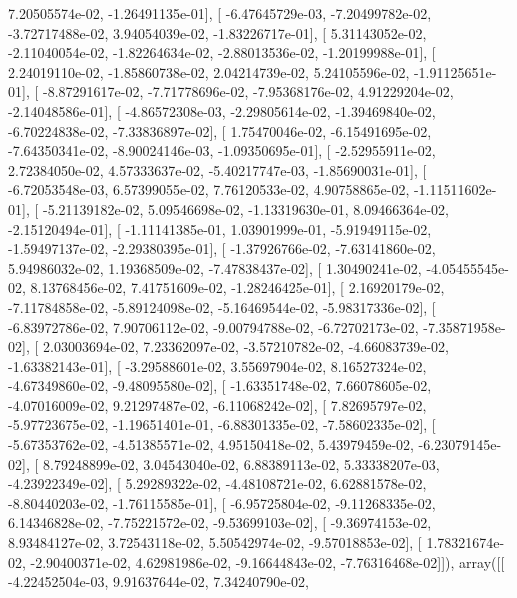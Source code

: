 \documentclass{article}
\begin{document}
          7.20505574e-02,  -1.26491135e-01],
       [ -6.47645729e-03,  -7.20499782e-02,  -3.72717488e-02,
          3.94054039e-02,  -1.83226717e-01],
       [  5.31143052e-02,  -2.11040054e-02,  -1.82264634e-02,
         -2.88013536e-02,  -1.20199988e-01],
       [  2.24019110e-02,  -1.85860738e-02,   2.04214739e-02,
          5.24105596e-02,  -1.91125651e-01],
       [ -8.87291617e-02,  -7.71778696e-02,  -7.95368176e-02,
          4.91229204e-02,  -2.14048586e-01],
       [ -4.86572308e-03,  -2.29805614e-02,  -1.39469840e-02,
         -6.70224838e-02,  -7.33836897e-02],
       [  1.75470046e-02,  -6.15491695e-02,  -7.64350341e-02,
         -8.90024146e-03,  -1.09350695e-01],
       [ -2.52955911e-02,   2.72384050e-02,   4.57333637e-02,
         -5.40217747e-03,  -1.85690031e-01],
       [ -6.72053548e-03,   6.57399055e-02,   7.76120533e-02,
          4.90758865e-02,  -1.11511602e-01],
       [ -5.21139182e-02,   5.09546698e-02,  -1.13319630e-01,
          8.09466364e-02,  -2.15120494e-01],
       [ -1.11141385e-01,   1.03901999e-01,  -5.91949115e-02,
         -1.59497137e-02,  -2.29380395e-01],
       [ -1.37926766e-02,  -7.63141860e-02,   5.94986032e-02,
          1.19368509e-02,  -7.47838437e-02],
       [  1.30490241e-02,  -4.05455545e-02,   8.13768456e-02,
          7.41751609e-02,  -1.28246425e-01],
       [  2.16920179e-02,  -7.11784858e-02,  -5.89124098e-02,
         -5.16469544e-02,  -5.98317336e-02],
       [ -6.83972786e-02,   7.90706112e-02,  -9.00794788e-02,
         -6.72702173e-02,  -7.35871958e-02],
       [  2.03003694e-02,   7.23362097e-02,  -3.57210782e-02,
         -4.66083739e-02,  -1.63382143e-01],
       [ -3.29588601e-02,   3.55697904e-02,   8.16527324e-02,
         -4.67349860e-02,  -9.48095580e-02],
       [ -1.63351748e-02,   7.66078605e-02,  -4.07016009e-02,
          9.21297487e-02,  -6.11068242e-02],
       [  7.82695797e-02,  -5.97723675e-02,  -1.19651401e-01,
         -6.88301335e-02,  -7.58602335e-02],
       [ -5.67353762e-02,  -4.51385571e-02,   4.95150418e-02,
          5.43979459e-02,  -6.23079145e-02],
       [  8.79248899e-02,   3.04543040e-02,   6.88389113e-02,
          5.33338207e-03,  -4.23922349e-02],
       [  5.29289322e-02,  -4.48108721e-02,   6.62881578e-02,
         -8.80440203e-02,  -1.76115585e-01],
       [ -6.95725804e-02,  -9.11268335e-02,   6.14346828e-02,
         -7.75221572e-02,  -9.53699103e-02],
       [ -9.36974153e-02,   8.93484127e-02,   3.72543118e-02,
          5.50542974e-02,  -9.57018853e-02],
       [  1.78321674e-02,  -2.90400371e-02,   4.62981986e-02,
         -9.16644843e-02,  -7.76316468e-02]]), array([[ -4.22452504e-03,   9.91637644e-02,   7.34240790e-02,
\end{document}
